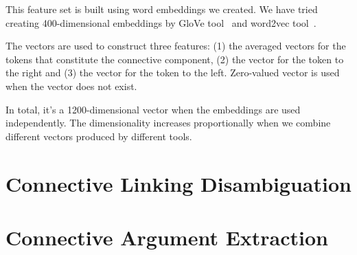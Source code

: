 This feature set is built using word embeddings we created.
We have tried creating 400-dimensional embeddings by GloVe tool~\citep{pennington2014glove}
and word2vec tool~\citep{mikolov2013efficient,mikolov2013distributed}.

The vectors are used to construct three features: (1) the averaged vectors
for the tokens that constitute the connective component, (2) the vector for the
token to the right and (3) the vector for the token to the left. Zero-valued vector is used
when the vector does not exist.

In total, it's a 1200-dimensional vector when the embeddings are used independently.
The dimensionality increases proportionally when we combine different vectors produced by
different tools.



\section{Connective Linking Disambiguation}
\section{Connective Argument Extraction}
